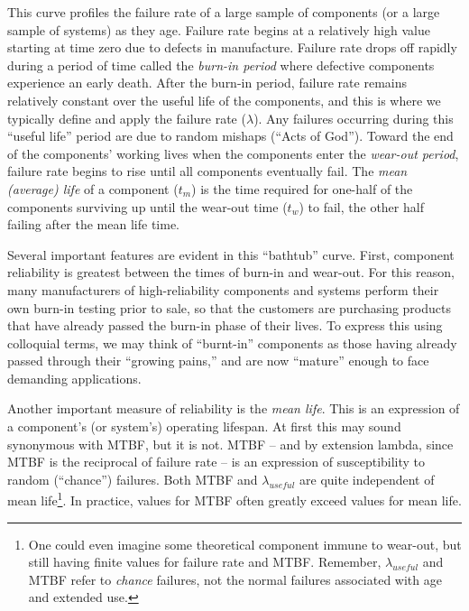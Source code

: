This curve profiles the failure rate of a large sample of components (or a large sample of systems) as they age.  Failure rate begins at a relatively high value starting at time zero due to defects in manufacture.  Failure rate drops off rapidly during a period of time called the \textit{burn-in period} where defective components experience an early death.  After the burn-in period, failure rate remains relatively constant over the useful life of the components, and this is where we typically define and apply the failure rate ($\lambda$).  Any failures occurring during this ``useful life'' period are due to random mishaps (``Acts of God'').  Toward the end of the components' working lives when the components enter the \textit{wear-out period}, failure rate begins to rise until all components eventually fail.  The \textit{mean (average) life} of a component ($t_m$) is the time required for one-half of the components surviving up until the wear-out time ($t_w$) to fail, the other half failing after the mean life time.        

Several important features are evident in this ``bathtub'' curve.  First, component reliability is greatest between the times of burn-in and wear-out.  For this reason, many manufacturers of high-reliability components and systems perform their own burn-in testing prior to sale, so that the customers are purchasing products that have already passed the burn-in phase of their lives.  To express this using colloquial terms, we may think of ``burnt-in'' components as those having already passed through their ``growing pains,'' and are now ``mature'' enough to face demanding applications.

Another important measure of reliability is the \textit{mean life}.  This is an expression of a component's (or system's) operating lifespan.  At first this may sound synonymous with MTBF, but it is not.  MTBF -- and by extension lambda, since MTBF is the reciprocal of failure rate -- is an expression of susceptibility to random (``chance'') failures.  Both MTBF and $\lambda_{useful}$ are quite independent of mean life\footnote{One could even imagine some theoretical component immune to wear-out, but still having finite values for failure rate and MTBF.  Remember, $\lambda_{useful}$ and MTBF refer to \textit{chance} failures, not the normal failures associated with age and extended use.}.  In practice, values for MTBF often greatly exceed values for mean life.  

